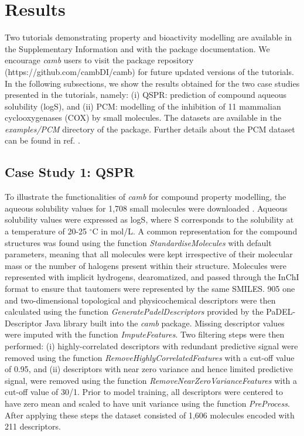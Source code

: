\documentclass[twoside,a4wide,10pt]{article}
\begin{document}
\section*{Results}
Two tutorials demonstrating property and bioactivity modelling are available in the Supplementary Information
and with the package documentation.
We encourage {\it camb} users to visit the package repository (https://github.com/cambDI/camb)
for future updated versions of the tutorials.
In the following subsections, we show the results obtained for the two case studies 
presented in the tutorials, namely:
(i) QSPR: prediction of compound aqueous solubility (logS),
and (ii) PCM:
modelling of the inhibition of 11 mammalian cyclooxygenases (COX) by small molecules.
The datasets are available in the {\it examples/PCM} directory of the package.
Further details about the PCM dataset can be found in ref. \citep{cortesCOX}.

\subsection{Case Study 1: QSPR}

To illustrate the functionalities of {\it camb} for compound property modelling, the aqueous solubility values for 1,708 small molecules were downloaded \citep{LogS}.
Aqueous solubility values were expressed as logS, where S corresponds to the solubility at a temperature of 20-25 $^{\circ}$C in mol/L.
A common representation for the compound structures was found using the function 
{\it StandardiseMolecules} with default parameters, meaning that all molecules were kept irrespective of their molecular mass or the number of halogens present within their structure.
Molecules were represented with implicit hydrogens, dearomatized, 
and passed through the InChI format to ensure that tautomers were represented by the same SMILES. 
905 one and two-dimensional topological and physicochemical descriptors were then calculated using the function {\it GeneratePadelDescriptors}
provided by the PaDEL-Descriptor \citep{padel} Java library built into the {\it camb} package.
Missing descriptor values were imputed with the function {\it ImputeFeatures}.
Two filtering steps were then performed: (i) highly-correlated descriptors with redundant predictive signal were removed using the function 
{\it RemoveHighlyCorrelatedFeatures} with a cut-off value of 0.95, and (ii) descriptors with near zero variance
and hence limited predictive signal, were removed using the function {\it RemoveNearZeroVarianceFeatures} with a cut-off value of 30/1.
Prior to model training, all descriptors were centered to have zero mean and scaled to have unit variance using the function {\it PreProcess}.
After applying these steps the dataset consisted of 1,606 molecules encoded with 211 descriptors.
\end{document}
